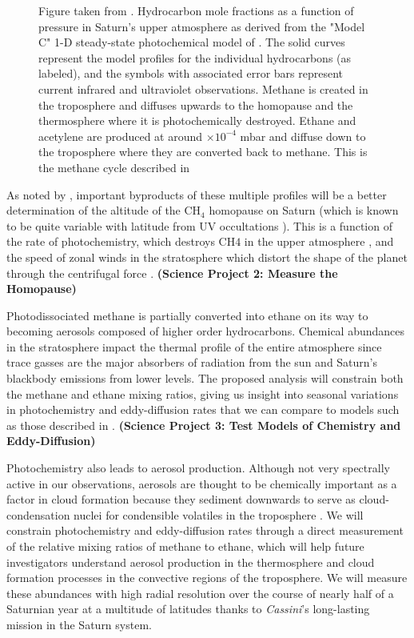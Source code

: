 \documentclass[preprint]{aastex}
\newcommand{\tdex}[1]{$\times 10^{#1}$}  %
\newcommand{\Cas}{{\it Cassini}}
\begin{document}
\begin{multicols}{2}
\begin{figure}[ht]
\caption{
\footnotesize
Figure taken from \cite{Fouchet09}. Hydrocarbon mole fractions as a function of
pressure in Saturn's upper atmosphere as derived from the "Model C" 1-D
steady-state photochemical model of \cite{Moses05}. The solid curves represent
the model profiles for the individual hydrocarbons (as labeled), and the
symbols with associated error bars represent current infrared and ultraviolet
observations. Methane is created in the troposphere and diffuses upwards to the
homopause and the thermosphere where it is photochemically destroyed. Ethane
and acetylene are produced at around \tdex{-4} mbar and diffuse down to the
troposphere where they are converted back to methane. This is the methane cycle
described in \cite{Strobel69}
}

\label{fig:MosesPlot}
\end{figure}

As noted by \cite{Fouchet09}, important byproducts of these multiple profiles
will be a better determination of the altitude of the CH$_4$ homopause on
Saturn (which is known to be quite variable with latitude from UV occultations
\citealp{Koskinen13, Koskinen15}). This is a function of the rate of
photochemistry, which destroys CH$4$ in the upper atmosphere \citep{Fouchet09},
and the speed of zonal winds in the stratosphere which distort the shape of the
planet through the centrifugal force \citep{Merritt19}.  {\bf (Science Project
2: Measure the Homopause)}

Photodissociated methane is partially converted into ethane on its way to
becoming aerosols composed of higher order hydrocarbons. Chemical abundances in
the stratosphere impact the thermal profile of the entire atmosphere since
trace gasses are the major absorbers of radiation from the sun and Saturn's
blackbody emissions from lower levels. The proposed analysis will constrain
both the methane and ethane mixing ratios, giving us insight into seasonal
variations in photochemistry and eddy-diffusion rates that we can compare to
models such as those described in \cite{Moses05}. {\bf (Science Project 3: 
Test Models of Chemistry and Eddy-Diffusion)}

Photochemistry also leads to aerosol production. Although not very spectrally
active in our observations, aerosols are thought to be chemically important as
a factor in cloud formation because they sediment downwards to serve as
cloud-condensation nuclei for condensible volatiles in the troposphere
\citep{Fletcher18}. We will constrain photochemistry and eddy-diffusion rates
through a direct measurement of the relative mixing ratios of methane to
ethane, which will help future investigators understand aerosol production in
the thermosphere and cloud formation processes in the convective regions of the
troposphere. We will measure these abundances with high radial resolution over
the course of nearly half of a Saturnian year at a multitude of latitudes
thanks to \Cas's long-lasting mission in the Saturn system.


\end{multicols}
\end{document}

